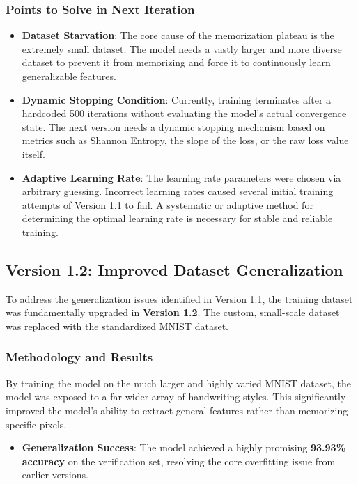 \documentclass[12pt,a4paper]{article}
\begin{document}
\subsubsection{Points to Solve in Next Iteration}
\begin{itemize}
    \item \textbf{Dataset Starvation}: The core cause of the memorization plateau is the extremely small dataset. The model needs a vastly larger and more diverse dataset to prevent it from memorizing and force it to continuously learn generalizable features.
    \item \textbf{Dynamic Stopping Condition}: Currently, training terminates after a hardcoded 500 iterations without evaluating the model's actual convergence state. The next version needs a dynamic stopping mechanism based on metrics such as Shannon Entropy, the slope of the loss, or the raw loss value itself.
    \item \textbf{Adaptive Learning Rate}: The learning rate parameters were chosen via arbitrary guessing. Incorrect learning rates caused several initial training attempts of Version 1.1 to fail. A systematic or adaptive method for determining the optimal learning rate is necessary for stable and reliable training.
\end{itemize}

\subsection{Version 1.2: Improved Dataset Generalization}
To address the generalization issues identified in Version 1.1, the training dataset was fundamentally upgraded in \textbf{Version 1.2}. The custom, small-scale dataset was replaced with the standardized MNIST dataset.

\subsubsection{Methodology and Results}
By training the model on the much larger and highly varied MNIST dataset, the model was exposed to a far wider array of handwriting styles. This significantly improved the model's ability to extract general features rather than memorizing specific pixels.
\begin{itemize}
    \item \textbf{Generalization Success}: The model achieved a highly promising \textbf{93.93\% accuracy} on the verification set, resolving the core overfitting issue from earlier versions.
\end{itemize}
\end{document}
